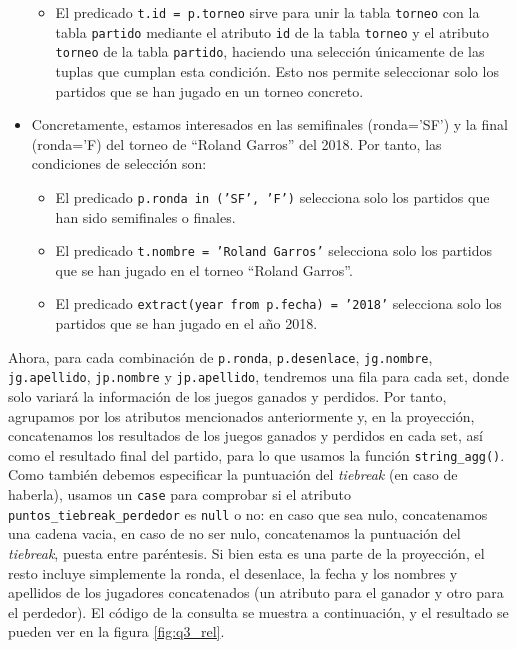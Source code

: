\begin{itemize}
\begin{itemize}
\item El predicado \texttt{t.id = p.torneo} sirve para unir la tabla \texttt{torneo} con la tabla \texttt{partido} mediante el atributo \texttt{id} de la tabla \texttt{torneo} y el atributo \texttt{torneo} de la tabla \texttt{partido}, haciendo una selección únicamente de las tuplas que cumplan esta condición. Esto nos permite seleccionar solo los partidos que se han jugado en un torneo concreto.
\end{itemize}
\item Concretamente, estamos interesados en las semifinales (ronda='SF') y la final (ronda='F) del torneo de ``Roland Garros'' del 2018. Por tanto, las condiciones de selección son:
\begin{itemize}
\item El predicado \texttt{p.ronda in ('SF', 'F')} selecciona solo los partidos que han sido semifinales o finales.
\item El predicado \texttt{t.nombre = 'Roland Garros'} selecciona solo los partidos que se han jugado en el torneo ``Roland Garros''.
\item El predicado \texttt{extract(year from p.fecha) = '2018'} selecciona solo los partidos que se han jugado en el año 2018.
\end{itemize}
\end{itemize}

Ahora, para cada combinación de \texttt{p.ronda}, \texttt{p.desenlace}, \texttt{jg.nombre}, \texttt{jg.apellido}, \texttt{jp.nombre} y \texttt{jp.apellido}, tendremos una fila para cada set, donde solo variará la información de los juegos ganados y perdidos. Por tanto, agrupamos por los atributos mencionados anteriormente y, en la proyección, concatenamos los resultados de los juegos ganados y perdidos en cada set, así como el resultado final del partido, para lo que usamos la función \texttt{string\_agg()}. Como también debemos especificar la puntuación del \textit{tiebreak} (en caso de haberla), usamos un \texttt{case} para comprobar si el atributo \texttt{puntos\_tiebreak\_perdedor} es \texttt{null} o no: en caso que sea nulo, concatenamos una cadena vacia, en caso de no ser nulo, concatenamos la puntuación del \textit{tiebreak}, puesta entre paréntesis. Si bien esta es una parte de la proyección, el resto incluye simplemente la ronda, el desenlace, la fecha y los nombres y apellidos de los jugadores concatenados (un atributo para el ganador y otro para el perdedor). El código de la consulta se muestra a continuación, y el resultado se pueden ver en la figura \ref{fig:q3_rel}.

